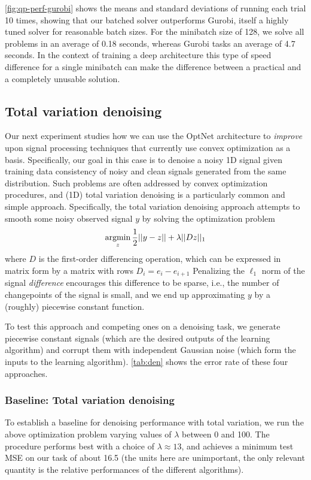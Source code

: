 \cref{fig:qp-perf-gurobi} shows the means and standard deviations
of running each trial 10 times, showing that our batched solver
outperforms Gurobi, itself a highly tuned solver for reasonable batch sizes.
For the minibatch size of 128, we solve all problems in an average of 0.18
seconds, whereas Gurobi tasks an average of 4.7 seconds.  In the context of
training a deep architecture this type of speed difference for a single
minibatch can make the difference between a practical and a completely unusable
solution.


\subsection{Total variation denoising}
Our next experiment studies how we can use the OptNet architecture to
\emph{improve} upon signal processing techniques that currently use convex
optimization as a basis.  Specifically, our goal in this case is to denoise a noisy
1D signal given training data consistency of noisy and clean signals generated
from the same distribution.  Such problems are often addressed by convex
optimization procedures, and (1D) total variation denoising is a particularly
common and simple approach.  Specifically, the total variation denoising
approach attempts to smooth some noisy observed signal $y$ by solving the
optimization problem
\begin{equation}
    \operatorname*{argmin}_z \frac{1}{2} ||y-z|| + \lambda ||Dz||_1
    \label{eq:tv}
\end{equation}
where $D$ is the first-order differencing operation, which
can be expressed in matrix form by a matrix with rows $D_i=e_i-e_{i+1}$
Penalizing the $\ell_1$
norm of the signal \emph{difference} encourages this
difference to be sparse,
i.e., the number of changepoints of the signal is small, and we end
up approximating $y$ by a (roughly) piecewise constant function.

To test this approach and competing ones on a denoising task,
we generate piecewise constant signals
(which are the desired outputs of the learning algorithm)
and corrupt them with independent Gaussian noise
(which form the inputs to the learning algorithm).
\cref{tab:den} shows the error rate of these
four approaches.

\subsubsection{Baseline: Total variation denoising}
To establish a baseline for denoising performance with total variation,
we run the above optimization problem varying values of
$\lambda$ between 0 and 100.
The procedure performs best with a choice of $\lambda \approx 13$,
and achieves a minimum test MSE on our task of about
16.5 (the units here are unimportant, the only relevant quantity is the
relative performances of the different algorithms).

